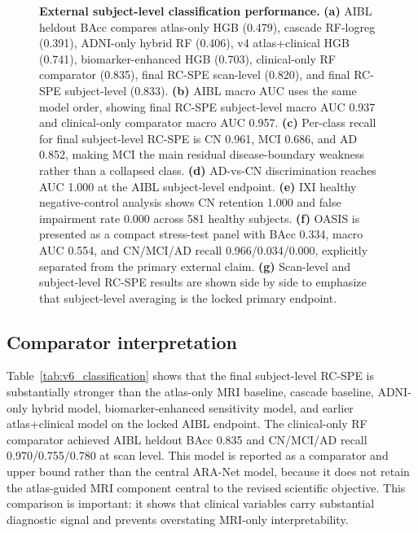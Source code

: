 \begin{figure}[p]
    \centering
    \caption{\textbf{External subject-level classification performance.} \textbf{(a)} AIBL heldout BAcc compares atlas-only HGB (0.479), cascade RF-logreg (0.391), ADNI-only hybrid RF (0.406), v4 atlas+clinical HGB (0.741), biomarker-enhanced HGB (0.703), clinical-only RF comparator (0.835), final RC-SPE scan-level (0.820), and final RC-SPE subject-level (0.833). \textbf{(b)} AIBL macro AUC uses the same model order, showing final RC-SPE subject-level macro AUC 0.937 and clinical-only comparator macro AUC 0.957. \textbf{(c)} Per-class recall for final subject-level RC-SPE is CN 0.961, MCI 0.686, and AD 0.852, making MCI the main residual disease-boundary weakness rather than a collapsed class. \textbf{(d)} AD-vs-CN discrimination reaches AUC 1.000 at the AIBL subject-level endpoint. \textbf{(e)} IXI healthy negative-control analysis shows CN retention 1.000 and false impairment rate 0.000 across 581 healthy subjects. \textbf{(f)} OASIS is presented as a compact stress-test panel with BAcc 0.334, macro AUC 0.554, and CN/MCI/AD recall 0.966/0.034/0.000, explicitly separated from the primary external claim. \textbf{(g)} Scan-level and subject-level RC-SPE results are shown side by side to emphasize that subject-level averaging is the locked primary endpoint.}
    \label{fig:v6_external_performance}
\end{figure}

\subsection{Comparator interpretation}
\label{sec:comparators}

Table~\ref{tab:v6_classification} shows that the final subject-level RC-SPE is substantially stronger than the atlas-only MRI baseline, cascade baseline, ADNI-only hybrid model, biomarker-enhanced sensitivity model, and earlier atlas+clinical model on the locked AIBL endpoint. The clinical-only RF comparator achieved AIBL heldout BAcc 0.835 and CN/MCI/AD recall 0.970/0.755/0.780 at scan level. This model is reported as a comparator and upper bound rather than the central ARA-Net model, because it does not retain the atlas-guided MRI component central to the revised scientific objective. This comparison is important: it shows that clinical variables carry substantial diagnostic signal and prevents overstating MRI-only interpretability.

